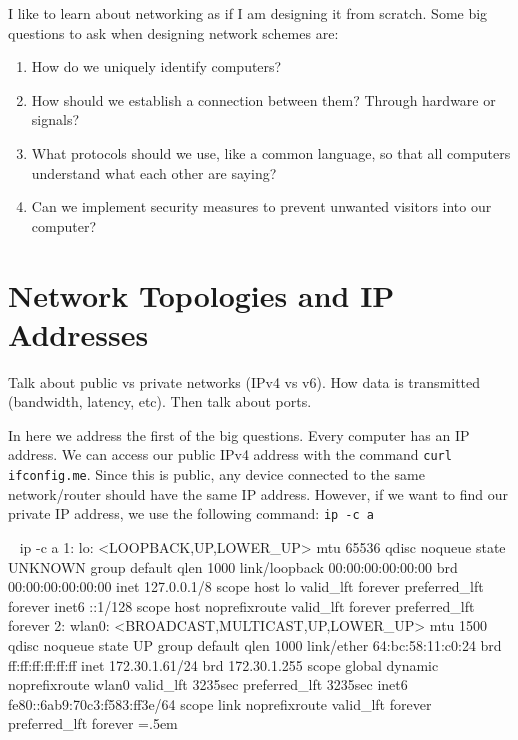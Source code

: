 \documentclass{article}
\newenvironment{cverbatim}
 {\SaveVerbatim{cverb}}
 {\endSaveVerbatim
  \flushleft\fboxrule=0pt\fboxsep=.5em
  \colorbox{cverbbg}{%
    \makebox[\dimexpr\linewidth-2\fboxsep][l]{\BUseVerbatim{cverb}}%
  }
  \endflushleft
}
\begin{document}
  I like to learn about networking as if I am designing it from scratch. Some big questions to ask when designing network schemes are:

  \begin{enumerate}
    \item How do we uniquely identify computers? 
    \item How should we establish a connection between them? Through hardware or signals? 
    \item What protocols should we use, like a common language, so that all computers understand what each other are saying? 
    \item Can we implement security measures to prevent unwanted visitors into our computer? 
  \end{enumerate} 

  \section{Network Topologies and IP Addresses}

    Talk about public vs private networks (IPv4 vs v6). How data is transmitted (bandwidth, latency, etc). Then talk about ports.  

    In here we address the first of the big questions. Every computer has an IP address. We can access our public IPv4 address with the command \texttt{curl ifconfig.me}. Since this is public, any device connected to the same network/router should have the same IP address. However, if we want to find our private IP address, we use the following command: \texttt{ip -c a}

    \begin{cverbatim}
      ~ ip -c a                                                                       
      1: lo: <LOOPBACK,UP,LOWER_UP> mtu 65536 qdisc noqueue state UNKNOWN group default qlen 1000
          link/loopback 00:00:00:00:00:00 brd 00:00:00:00:00:00
          inet 127.0.0.1/8 scope host lo
             valid_lft forever preferred_lft forever
          inet6 ::1/128 scope host noprefixroute 
             valid_lft forever preferred_lft forever
      2: wlan0: <BROADCAST,MULTICAST,UP,LOWER_UP> mtu 1500 qdisc noqueue state UP group default qlen 1000
          link/ether 64:bc:58:11:c0:24 brd ff:ff:ff:ff:ff:ff
          inet 172.30.1.61/24 brd 172.30.1.255 scope global dynamic noprefixroute wlan0
             valid_lft 3235sec preferred_lft 3235sec
          inet6 fe80::6ab9:70c3:f583:ff3e/64 scope link noprefixroute 
             valid_lft forever preferred_lft forever
    \end{cverbatim}
\end{document}
